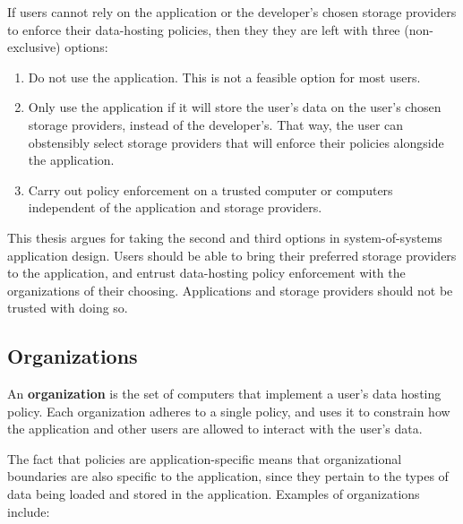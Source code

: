 If users cannot rely on the application or the developer's chosen storage providers
to enforce their data-hosting policies, then they they are left with three
(non-exclusive) options:

\begin{enumerate}
   \item Do not use the application.  This is not a feasible option for
      most users.
   \item Only use the application if it will store the user's data on the user's
      chosen storage providers, instead of the developer's.  That
      way, the user can obstensibly select storage providers that will enforce 
      their policies alongside the application.
   \item Carry out policy enforcement on a trusted computer or computers
      independent of the application and storage providers.
\end{enumerate}

This thesis argues for taking the second and third options in system-of-systems
application design.  Users should be able to
bring their preferred storage providers to the application, and entrust
data-hosting policy enforcement with the organizations of their choosing.
Applications and storage providers should not be trusted with doing so.

\subsection{Organizations}

An \textbf{organization} is the set of computers that implement a user's
data hosting policy.  Each organization adheres to a single
policy, and uses it to constrain how the application and other users are allowed to
interact with the user's data.

The fact that policies are application-specific means that organizational boundaries
are also specific to the application, since they pertain to the types of data being loaded
and stored in the application.  Examples of organizations include:

